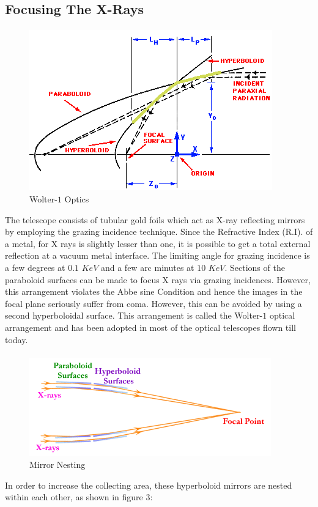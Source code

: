 \documentclass[a4paper,twoside]{report}
\numberwithin{equation}{section}
\begin{document}
\subsection{Focusing The X-Rays}
\paragraph{}
\begin{figure}
\includegraphics[width=0.9\linewidth]{paraboloid_hyperboloid.png} 
\caption{Wolter-$1$ Optics}
\label{fig:Wolter-1 optics}
\end{figure} 
The telescope consists of tubular gold foils which act as X-ray reflecting mirrors by employing the grazing incidence technique. Since the Refractive Index (R.I). of a metal, for X rays is slightly lesser than one, it is possible to get a total external reflection at a vacuum metal interface. The limiting angle for grazing incidence is a few degrees at $0.1$ $KeV$ and a few arc minutes at $10$ $KeV$. Sections of the paraboloid surfaces can be made to focus X rays via grazing incidences. However, this arrangement violates the Abbe sine Condition and hence the images in the focal plane seriously suffer from coma. However, this can be avoided by using a second hyperboloidal surface. This arrangement is called the Wolter-$1$ optical arrangement and has been adopted in most of the optical telescopes flown till today. 
\paragraph{}
\begin{figure}
\includegraphics[width=1.0\linewidth]{teles2_th.png} 
\caption{Mirror Nesting}
\label{fig:Mirror nesting}
\end{figure}
In order to increase the collecting area, these hyperboloid mirrors are nested within each other, as shown in figure $3$:
\end{document}
